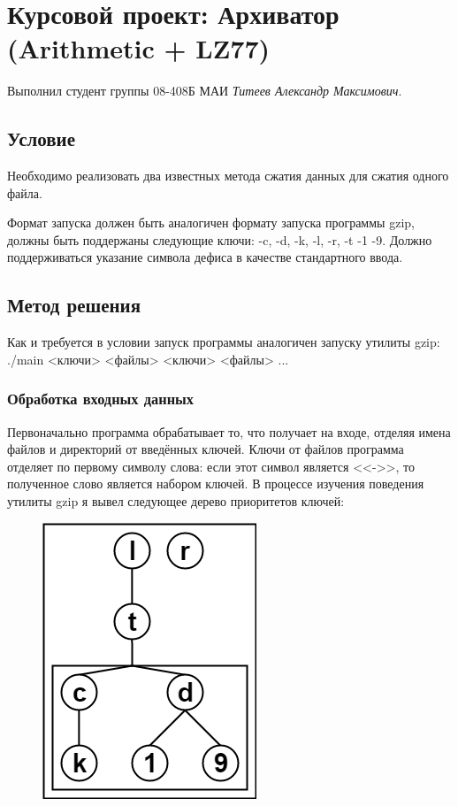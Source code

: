 \documentclass[12pt]{article}
\begin{document}
\section*{Курсовой проект: Архиватор (Arithmetic + LZ77)}
\noindent
Выполнил студент группы 08-408Б МАИ \textit{Титеев Александр Максимович}.

\subsection*{Условие}

Необходимо реализовать два известных метода сжатия данных для сжатия одного файла. 

Формат запуска должен быть аналогичен формату запуска программы gzip, должны быть поддержаны следующие ключи: -c, -d, -k, -l, -r, -t -1 -9. Должно поддерживаться указание символа дефиса в качестве стандартного ввода.

\subsection*{Метод решения}

Как и требуется в условии запуск программы аналогичен запуску утилиты gzip: ./main <ключи> <файлы> <ключи> <файлы> ...

\subsubsection*{Обработка входных данных}

Первоначально программа обрабатывает то, что получает на входе, отделяя имена файлов и директорий от введённых ключей. Ключи от файлов программа отделяет по первому символу слова: если этот символ является <<->>, то полученное слово является набором ключей. В процессе изучения поведения утилиты gzip я вывел следующее дерево приоритетов ключей:

\begin{figure}[h!]
	\centering\includegraphics[scale=0.5]{KeyTree}
\end{figure}
\end{document}

